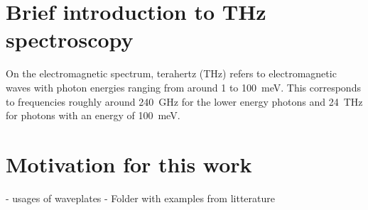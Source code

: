 \section{Brief introduction to THz spectroscopy}
On the electromagnetic spectrum, terahertz (THz) refers to electromagnetic waves with photon energies ranging from around 1 to \SI{100}{\milli \electronvolt}. This corresponds to frequencies roughly around \SI{240}{\giga \hertz} for the lower energy photons and \SI{24}{\tera \hertz} for photons with an energy of \SI{100}{\milli \electronvolt}.


\section{Motivation for this work}
- usages of waveplates
- Folder with examples from litterature
